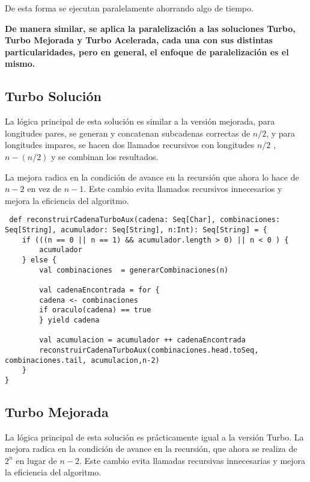 \documentclass[conference]{IEEEtran}
\begin{document}
De esta forma se ejecutan paralelamente ahorrando algo de tiempo.

\textbf{De manera similar, se aplica la paralelización a las soluciones Turbo, Turbo Mejorada y Turbo Acelerada, cada una con sus distintas particularidades, pero en general, el enfoque de paralelización es el mismo.}

\subsection{\textbf{Turbo Solución}}
La lógica principal de esta solución es similar a la versión mejorada, para longitudes pares, se generan y concatenan subcadenas correctas de $n/2$, y para longitudes impares, se hacen dos llamados recursivos con longitudes $n/2$ , $n-(n/2)$ y se combinan los resultados.

La mejora radica en la condición de avance en la recursión que ahora lo hace de $n-2$ en vez de $n-1$. Este cambio evita llamados recursivos innecesarios y mejora la eficiencia del algoritmo.

\begin{lstlisting}
 def reconstruirCadenaTurboAux(cadena: Seq[Char], combinaciones: Seq[String], acumulador: Seq[String], n:Int): Seq[String] = {
    if (((n == 0 || n == 1) && acumulador.length > 0) || n < 0 ) {
        acumulador
    } else {
        val combinaciones  = generarCombinaciones(n)
                
        val cadenaEncontrada = for {
        cadena <- combinaciones
        if oraculo(cadena) == true
        } yield cadena
            
        val acumulacion = acumulador ++ cadenaEncontrada
        reconstruirCadenaTurboAux(combinaciones.head.toSeq, combinaciones.tail, acumulacion,n-2)
    }
}
\end{lstlisting}

\subsection{\textbf{Turbo Mejorada}}


La lógica principal de esta solución es prácticamente igual a la versión Turbo. La mejora radica en la condición de avance en la recursión, que ahora se realiza de $2^n$ en lugar de $n-2$. Este cambio evita llamadas recursivas innecesarias y mejora la eficiencia del algoritmo.
\end{document}
